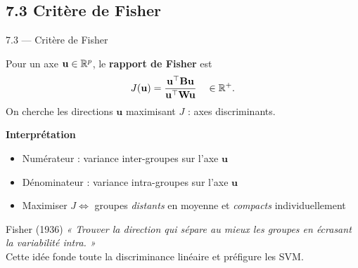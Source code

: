 \subsection{7.3 Critère de Fisher}
\begin{frame}{7.3 — Critère de Fisher}
\begin{definition}
Pour un axe $\mathbf{u} \in \mathbb{R}^p$, le \textbf{rapport de Fisher} est
\[
J(\mathbf{u}) = \frac{\mathbf{u}^\top \mathbf{B} \mathbf{u}}{\mathbf{u}^\top \mathbf{W} \mathbf{u}}
\quad\in\mathbb{R}^+.
\]
On cherche les directions $\mathbf{u}$ maximisant $J$ : axes \alert{discriminants}.
\end{definition}

\textbf{Interprétation}
\begin{itemize}\small
  \item Numérateur : variance \alert{inter-groupes} sur l'axe $\mathbf{u}$
  \item Dénominateur : variance \alert{intra-groupes} sur l'axe $\mathbf{u}$
  \item Maximiser $J \Leftrightarrow$ groupes \emph{distants} en moyenne et
        \emph{compacts} individuellement
\end{itemize}

\begin{block}{Fisher (1936)}
\small \emph{« Trouver la direction qui sépare au mieux les groupes en
écrasant la variabilité intra. »}\\
Cette idée fonde toute la \alert{discriminance linéaire} et préfigure les SVM.
\end{block}
\end{frame}

